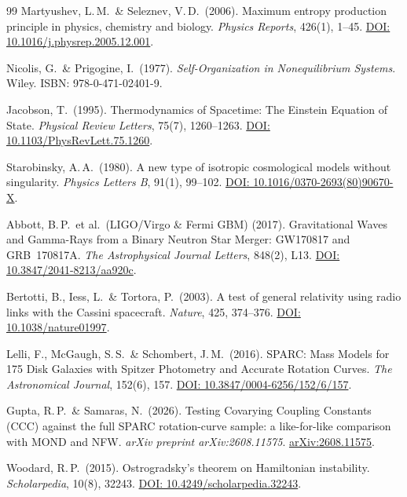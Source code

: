 \documentclass[aps,prd,twocolumn,superscriptaddress,nofootinbib]{revtex4-2}
\begin{document}
\begin{thebibliography}{99}
Martyushev, L.\,M.\ \& Seleznev, V.\,D.\ (2006).
Maximum entropy production principle in physics, chemistry and biology.
\textit{Physics Reports}, 426(1), 1--45.
\href{https://doi.org/10.1016/j.physrep.2005.12.001}{DOI: 10.1016/j.physrep.2005.12.001}.

Nicolis, G.\ \& Prigogine, I.\ (1977).
\textit{Self-Organization in Nonequilibrium Systems}. Wiley. ISBN: 978-0-471-02401-9.

Jacobson, T.\ (1995).
Thermodynamics of Spacetime: The Einstein Equation of State.
\textit{Physical Review Letters}, 75(7), 1260--1263.
\href{https://doi.org/10.1103/PhysRevLett.75.1260}{DOI: 10.1103/PhysRevLett.75.1260}.

Starobinsky, A.\,A.\ (1980).
A new type of isotropic cosmological models without singularity.
\textit{Physics Letters B}, 91(1), 99--102.
\href{https://doi.org/10.1016/0370-2693(80)90670-X}{DOI: 10.1016/0370-2693(80)90670-X}.

Abbott, B.\,P.\ et al.\ (LIGO/Virgo \& Fermi GBM) (2017).
Gravitational Waves and Gamma-Rays from a Binary Neutron Star Merger: GW170817 and GRB~170817A.
\textit{The Astrophysical Journal Letters}, 848(2), L13.
\href{https://doi.org/10.3847/2041-8213/aa920c}{DOI: 10.3847/2041-8213/aa920c}.

Bertotti, B., Iess, L.\ \& Tortora, P.\ (2003).
A test of general relativity using radio links with the Cassini spacecraft.
\textit{Nature}, 425, 374--376.
\href{https://doi.org/10.1038/nature01997}{DOI: 10.1038/nature01997}.

Lelli, F., McGaugh, S.\,S.\ \& Schombert, J.\,M.\ (2016).
SPARC: Mass Models for 175 Disk Galaxies with Spitzer Photometry and Accurate Rotation Curves.
\textit{The Astronomical Journal}, 152(6), 157.
\href{https://doi.org/10.3847/0004-6256/152/6/157}{DOI: 10.3847/0004-6256/152/6/157}.

Gupta, R.\,P.\ \& Samaras, N.\ (2026).
Testing Covarying Coupling Constants (CCC) against the full SPARC rotation-curve sample: a like-for-like comparison with MOND and NFW.
\textit{arXiv preprint arXiv:2608.11575}.
\href{https://arxiv.org/abs/2608.11575}{arXiv:2608.11575}.

Woodard, R.\,P.\ (2015).
Ostrogradsky's theorem on Hamiltonian instability.
\textit{Scholarpedia}, 10(8), 32243.
\href{https://doi.org/10.4249/scholarpedia.32243}{DOI: 10.4249/scholarpedia.32243}.


\end{thebibliography}
\end{document}
